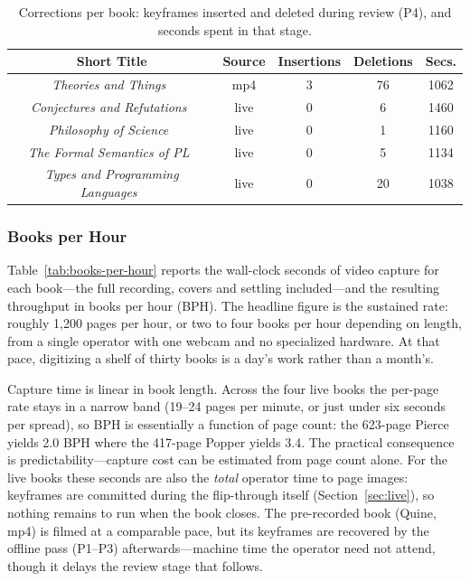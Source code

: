 \documentclass{article}
\begin{document}
\begin{table}[t!]
  \centering
  \footnotesize
  \setlength{\tabcolsep}{3pt}
  \begin{tabular}{|c|c|c|c|c|}
    \hline
    \textbf{Short Title} & \textbf{Source} & \textbf{Insertions} & \textbf{Deletions} & \textbf{Secs.}\\
    \hline\hline
    \emph{Theories and Things}~\cite{quine1981theories} & mp4 & 3 & 76 & 1062\\
    \emph{Conjectures and Refutations}~\cite{popper1963conjectures} & live & 0 & 6 & 1460\\
    \emph{Philosophy of Science}~\cite{shanker2003philosophy} & live & 0 & 1 & 1160\\
    \emph{The Formal Semantics of PL}~\cite{winskel1993formal} & live & 0 & 5 & 1134\\
    \emph{Types and Programming Languages}~\cite{pierce2002types} & live & 0 & 20 & 1038\\
    \hline
  \end{tabular}
  \caption{Corrections per book: keyframes inserted and deleted during review
  (P4), and seconds spent in that stage.}
  \label{tab:corrs-per-book}
\end{table}

\subsubsection{Books per Hour}
\label{sec:eval-bph}

Table~\ref{tab:books-per-hour} reports the wall-clock seconds of video capture for each
book---the full recording, covers and settling included---and the resulting
throughput in books per hour (BPH). The headline figure is the sustained rate:
roughly 1{,}200 pages per hour, or two to four books per hour depending on
length, from a single operator with one webcam and no specialized hardware. At
that pace, digitizing a shelf of thirty books is a day's work rather than a
month's.

Capture time is linear in book length. Across the four live books the per-page
rate stays in a narrow band (19--24 pages per minute, or just under six
seconds per spread), so BPH is essentially a function of page count: the
623-page Pierce yields 2.0 BPH where the 417-page Popper yields 3.4. The
practical consequence is predictability---capture cost can be estimated from
page count alone. For the live books these seconds are also the \emph{total}
operator time to page images: keyframes are committed during the flip-through
itself (Section~\ref{sec:live}), so nothing remains to run when the book
closes. The pre-recorded book (Quine, mp4) is filmed at a comparable pace, but
its keyframes are recovered by the offline pass (P1--P3) afterwards---machine
time the operator need not attend, though it delays the review stage that
follows.
\end{document}
